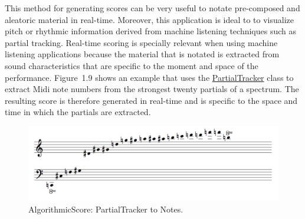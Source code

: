 This method for generating scores can be very useful to notate pre-composed and aleatoric material in real-time. Moreover, this application is ideal to to visualize pitch or rhythmic information derived from machine listening techniques such as partial tracking. Real-time scoring is specially relevant when using machine listening applications because the material that is notated is extracted from sound characteristics that are specific to the moment and space of the performance. \mbox{Figure 1.9} shows an example that uses the \hyperlink{partrack}{PartialTracker} class to extract Midi note numbers from the strongest twenty partials of a spectrum. The resulting score is therefore generated in real-time and is specific to the space and time in which the partials are extracted.
\begin{figure}[htbp] %
   \centering
   \includegraphics[width=17cm]{Chapter6/algoScore_partials.tif} %
   \caption{AlgorithmicScore: PartialTracker to Notes.}
   \label{fig:example}
\end{figure}\

